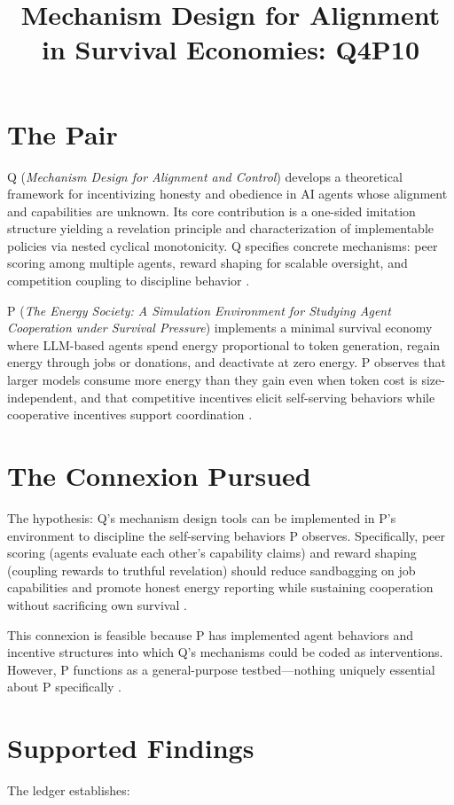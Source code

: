 \documentclass{article}
\title{Mechanism Design for Alignment in Survival Economies: Q4P10}
\begin{document}
\section*{The Pair}

Q (\textit{Mechanism Design for Alignment and Control}) develops a theoretical framework for incentivizing honesty and obedience in AI agents whose alignment and capabilities are unknown. Its core contribution is a one-sided imitation structure yielding a revelation principle and characterization of implementable policies via nested cyclical monotonicity. Q specifies concrete mechanisms: peer scoring among multiple agents, reward shaping for scalable oversight, and competition coupling to discipline behavior .

P (\textit{The Energy Society: A Simulation Environment for Studying Agent Cooperation under Survival Pressure}) implements a minimal survival economy where LLM-based agents spend energy proportional to token generation, regain energy through jobs or donations, and deactivate at zero energy. P observes that larger models consume more energy than they gain even when token cost is size-independent, and that competitive incentives elicit self-serving behaviors while cooperative incentives support coordination .

\section*{The Connexion Pursued}

The hypothesis: Q's mechanism design tools can be implemented in P's environment to discipline the self-serving behaviors P observes. Specifically, peer scoring (agents evaluate each other's capability claims) and reward shaping (coupling rewards to truthful revelation) should reduce sandbagging on job capabilities and promote honest energy reporting while sustaining cooperation without sacrificing own survival .

This connexion is feasible because P has implemented agent behaviors and incentive structures into which Q's mechanisms could be coded as interventions. However, P functions as a general-purpose testbed---nothing uniquely essential about P specifically .

\section*{Supported Findings}

The ledger establishes:
\end{document}
